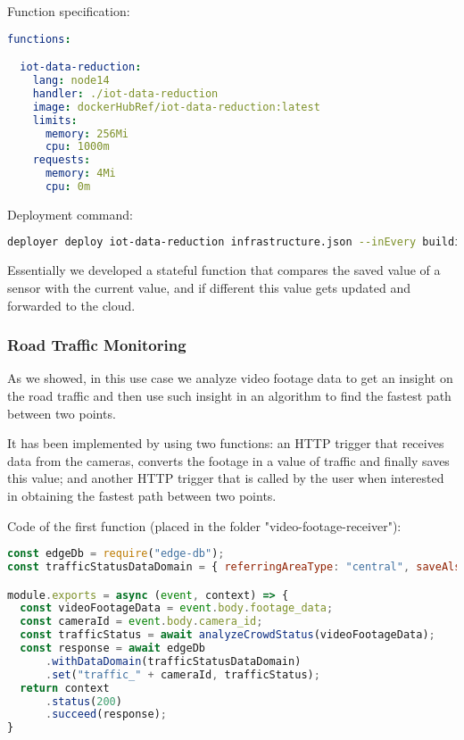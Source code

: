 Function specification:
\begin{lstlisting}[language=yaml,firstnumber=1]
functions:

  iot-data-reduction:
    lang: node14
    handler: ./iot-data-reduction
    image: dockerHubRef/iot-data-reduction:latest
    limits:
      memory: 256Mi
      cpu: 1000m
    requests:
      memory: 4Mi
      cpu: 0m
\end{lstlisting}

Deployment command:
\begin{lstlisting}[language=bash]
deployer deploy iot-data-reduction infrastructure.json --inEvery building --inAreas factory1 factory2
\end{lstlisting}

Essentially we developed a stateful function that compares the saved value of a sensor with the current value, and if different this value gets updated and forwarded to the cloud.


\subsubsection{Road Traffic Monitoring}
As we showed, in this use case we analyze video footage data to get an insight on the road traffic and then use such insight in an algorithm to find the fastest path between two points.

It has been implemented by using two functions: an HTTP trigger that receives data from the cameras, converts the footage in a value of traffic and finally saves this value; and another HTTP trigger that is called by the user when interested in obtaining the fastest path between two points.

Code of the first function (placed in the folder "video-footage-receiver"):
\begin{lstlisting}[language=javascript]
const edgeDb = require("edge-db");
const trafficStatusDataDomain = { referringAreaType: "central", saveAlsoInIntermediateLevels: true, ttl: 30*60*1000 }; // 30 minutes TTL.

module.exports = async (event, context) => {
  const videoFootageData = event.body.footage_data;
  const cameraId = event.body.camera_id;
  const trafficStatus = await analyzeCrowdStatus(videoFootageData);
  const response = await edgeDb
      .withDataDomain(trafficStatusDataDomain)
      .set("traffic_" + cameraId, trafficStatus);
  return context
      .status(200)
      .succeed(response);
}
\end{lstlisting}

